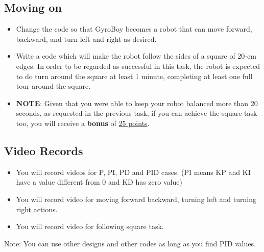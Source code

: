 \documentclass{scrartcl}
\begin{document}
\subsection{Moving on}

  \begin{itemize}
    \item Change the code so that GyroBoy becomes a robot that can move forward, backward, and turn left and right as desired.
    \item Write a code which will make the robot follow the sides of a square of 20-cm edges. In order to be regarded as successful in this task, the robot is expected to do turn around the square at least 1 minute, completing at least one full tour around the square.
    \item \textbf{NOTE}: Given that you were able to keep your robot balanced more than 20 seconds, as requested in the previous task, if you can achieve the square task too, you will receive a \textbf{bonus} of \underline{25 points}.
  \end{itemize}

\subsection{Video Records}
  \begin{itemize}
    \item You will record videos for P, PI, PD and PID cases. (PI means KP and KI have a value different from 0 and KD has zero value)
    \item You will record video for moving forward backward, turning left and turning right actions.
    \item You will record video for following square task.
  \end{itemize}

Note: You can use other designs and other codes as long as you find PID values.
 
\end{document}
